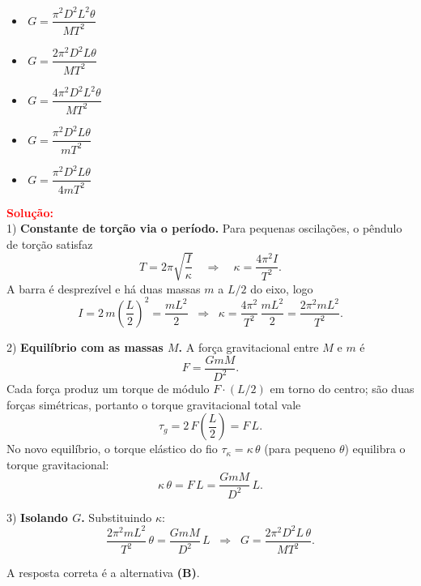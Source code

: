 \documentclass[a4paper,12pt]{article}
\begin{document}
\begin{flushleft}
\begin{itemize}
\item[(A)] $\,G=\dfrac{\pi^2 D^2 L^2 \theta}{M T^2}$
\item[(B)] $\,G=\dfrac{2\pi^2 D^2 L \theta}{M T^2}$
\item[(C)] $\,G=\dfrac{4\pi^2 D^2 L^2 \theta}{M T^2}$
\item[(D)] $\,G=\dfrac{\pi^2 D^2 L \theta}{m T^2}$
\item[(E)] $\,G=\dfrac{\pi^2 D^2 L \theta}{4m T^2}$
\end{itemize}

\vspace{0.5cm}

\textcolor{red}{\textbf{Solu\c{c}\~ao:}}\\[2mm]

1) \textbf{\colorbox{yellow!30}{Constante de tor\c{c}\~ao via o per\'iodo.}} Para pequenas oscila\c{c}\~oes, o p\^endulo de tor\c{c}\~ao satisfaz
\[
T=2\pi\sqrt{\frac{I}{\kappa}}
\quad\Rightarrow\quad
\boxed{\kappa=\frac{4\pi^2 I}{T^2}}.
\]
A barra \'e desprez\'ivel e h\'a duas massas $m$ a $L/2$ do eixo, logo
\[
I=2\,m\left(\frac{L}{2}\right)^2=\frac{mL^2}{2}
\;\;\Rightarrow\;\;
\kappa=\frac{4\pi^2}{T^2}\,\frac{mL^2}{2}
=\frac{2\pi^2 m L^2}{T^2}.
\]

2)  \textbf{\colorbox{yellow!30}{Equil\'ibrio com as massas $M$.}} A for\c{c}a gravitacional entre $M$ e $m$ \'e
\[
F=\frac{G m M}{D^2}.
\]
Cada for\c{c}a produz um torque de m\'odulo $F\cdot (L/2)$ em torno do centro; s\~ao duas for\c{c}as sim\'etricas, portanto o torque gravitacional total vale
\[
\tau_g=2\,F\left(\frac{L}{2}\right)=F\,L.
\]
No novo equil\'ibrio, \colorbox{yellow!30}{o torque el\'astico do fio $\tau_{\kappa}=\kappa\,\theta$ (para pequeno $\theta$)} equilibra o torque gravitacional:
\[
\kappa\,\theta=F\,L=\frac{G m M}{D^2}\,L.
\]

3) \textbf{Isolando $G$.} Substituindo $\kappa$:
\[
\frac{2\pi^2 m L^2}{T^2}\,\theta=\frac{G m M}{D^2}\,L
\;\;\Rightarrow\;\;
\boxed{G=\frac{2\pi^2 D^2 L\,\theta}{M T^2}.}
\]

\medskip

A resposta correta \'e a alternativa \colorbox{green!50}{\textbf{(B)}}.

\end{flushleft}
\end{document}
